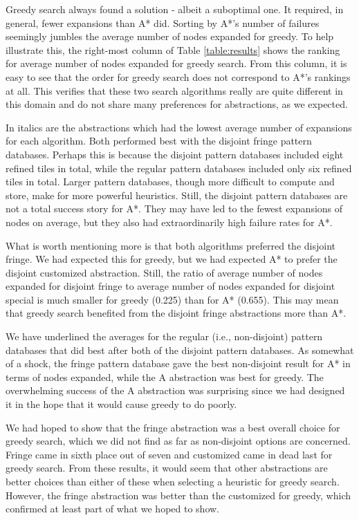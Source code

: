 \documentclass[letterpaper]{article}
\begin{document}
Greedy search always found a solution - albeit a suboptimal one. It required, in general, fewer expansions than A* did.  Sorting by A*'s number of failures seemingly jumbles the average number of nodes expanded for greedy.  To help illustrate this, the right-most column of Table \ref{table:results} shows the ranking for average number of nodes expanded for greedy search.  From this column, it is easy to see that the order for greedy search does not correspond to A*'s rankings at all.  This verifies that these two search algorithms really are quite different in this domain and do not share many preferences for abstractions, as we expected.

In italics are the abstractions which had the lowest average number of expansions for each algorithm.  Both performed best with the disjoint fringe pattern databases.  Perhaps this is because the disjoint pattern databases included eight refined tiles in total, while the regular pattern databases included only six refined tiles in total.  Larger pattern databases, though more difficult to compute and store, make for more powerful heuristics.  Still, the disjoint pattern databases are not a total success story for A*.  They may have led to the fewest expansions of nodes on average, but they also had extraordinarily high failure rates for A*.

What is worth mentioning more is that both algorithms preferred the disjoint fringe.  We had expected this for greedy, but we had expected A* to prefer the disjoint customized abstraction.  Still, the ratio of average number of nodes expanded for disjoint fringe to average number of nodes expanded for disjoint special is much smaller for greedy (0.225) than for A* (0.655).  This may mean that greedy search benefited from the disjoint fringe abstractions more than A*.

We have underlined the averages for the regular (i.e., non-disjoint) pattern databases that did best after both of the disjoint pattern databases.  As somewhat of a shock, the fringe pattern database gave the best non-disjoint result for A* in terms of nodes expanded, while the A abstraction was best for greedy.  The overwhelming success of the A abstraction was surprising since we had designed it in the hope that it would cause greedy to do poorly.

We had hoped to show that the fringe abstraction was a best overall choice for greedy search, which we did not find as far as non-disjoint options are concerned.  Fringe came in sixth place out of seven and customized came in dead last for greedy search.  From these results, it would seem that other abstractions are better choices than either of these when selecting a heuristic for greedy search.  However, the fringe abstraction was better than the customized for greedy, which confirmed at least part of what we hoped to show.  
\end{document}

